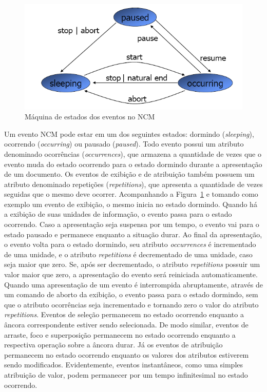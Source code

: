 \begin{figure}[!ht]
    \centering
    \includegraphics[scale=0.6,keepaspectratio=true]{figuras/maquinaEstadoNCM.png}
    \caption{Máquina de estados dos eventos no NCM \cite{Soares:2005qy}}
    \label{fig:maqEstado}
\end{figure}

Um evento NCM pode estar em um dos seguintes estados: dormindo (\textit{sleeping}), ocorrendo (\textit{occurring}) ou pausado (\textit{paused}). Todo evento possui um atributo denominado ocorrências (\textit{occurrences}), que armazena a quantidade de vezes que o evento muda do estado ocorrendo para o estado dormindo durante a apresentação de um documento. Os eventos de exibição e de atribuição também possuem um atributo denominado repetições (\textit{repetitions}), que apresenta a quantidade de vezes seguidas que o mesmo deve ocorrer. Acompanhando a Figura~\ref{fig:maqEstado} e tomando como exemplo um evento de exibição, o mesmo  inicia no estado dormindo. Quando há a exibição de suas unidades de informação, o evento passa para o estado ocorrendo. Caso a apresentação seja suspensa por um tempo, o evento vai para o estado pausado e permanece enquanto a situação durar. Ao final da apresentação, o evento volta para o estado dormindo, seu atributo \textit{occurrences} é incrementado de uma unidade, e o atributo \textit{repetitions} é decrementado de uma unidade, caso seja maior que zero. Se, após ser decrementado, o atributo \textit{repetitions} possuir um valor maior que zero, a apresentação do evento será reiniciada automaticamente. Quando uma apresentação de um evento é interrompida abruptamente, através de um comando de aborto da exibição, o evento passa para o estado dormindo, sem que o atributo ocorrências seja incrementado e tornando zero o valor do atributo \textit{repetitions}. Eventos de seleção permanecem no estado ocorrendo enquanto a âncora correspondente estiver sendo selecionada. De modo similar, eventos de arraste, foco e superposição permanecem no estado ocorrendo enquanto a respectiva operação sobre a âncora durar. Já os eventos de atribuição permanecem no estado ocorrendo enquanto os valores dos atributos estiverem sendo modificados. Evidentemente, eventos instantâneos, como uma simples atribuição de valor, podem permanecer por um tempo infinitesimal no estado ocorrendo.

